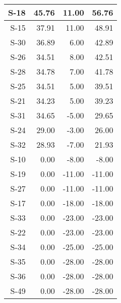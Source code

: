 \begin{tabular}{ | r | r | r | r | }
    \hline
                  S-18  &           45.76  &           11.00  &           56.76  \\
    \hline
                  S-15  &           37.91  &           11.00  &           48.91  \\
    \hline
                  S-30  &           36.89  &            6.00  &           42.89  \\
    \hline
                  S-26  &           34.51  &            8.00  &           42.51  \\
    \hline
                  S-28  &           34.78  &            7.00  &           41.78  \\
    \hline
                  S-25  &           34.51  &            5.00  &           39.51  \\
    \hline
                  S-21  &           34.23  &            5.00  &           39.23  \\
    \hline
                  S-31  &           34.65  &           -5.00  &           29.65  \\
    \hline
                  S-24  &           29.00  &           -3.00  &           26.00  \\
    \hline
                  S-32  &           28.93  &           -7.00  &           21.93  \\
    \hline
                  S-10  &            0.00  &           -8.00  &           -8.00  \\
    \hline
                  S-19  &            0.00  &          -11.00  &          -11.00  \\
    \hline
                  S-27  &            0.00  &          -11.00  &          -11.00  \\
    \hline
                  S-17  &            0.00  &          -18.00  &          -18.00  \\
    \hline
                  S-33  &            0.00  &          -23.00  &          -23.00  \\
    \hline
                  S-22  &            0.00  &          -23.00  &          -23.00  \\
    \hline
                  S-34  &            0.00  &          -25.00  &          -25.00  \\
    \hline
                  S-35  &            0.00  &          -28.00  &          -28.00  \\
    \hline
                  S-36  &            0.00  &          -28.00  &          -28.00  \\
    \hline
                  S-49  &            0.00  &          -28.00  &          -28.00  \\

\end{tabular}
